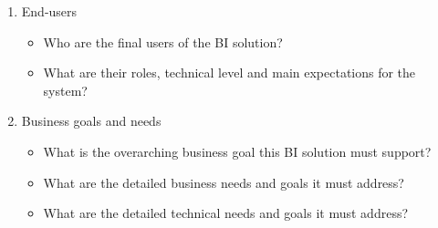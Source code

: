 \begin{enumerate}
    \item End-users
    \begin{itemize}
        \item Who are the final users of the BI solution?
        \item What are their roles, technical level and main expectations for the system?
    \end{itemize}

    \item Business goals and needs
    \begin{itemize}
        \item What is the overarching business goal this BI solution must support?
        \item What are the detailed business needs and goals it must address?
        \item What are the detailed technical needs and goals it must address?
    \end{itemize}


\end{enumerate}
